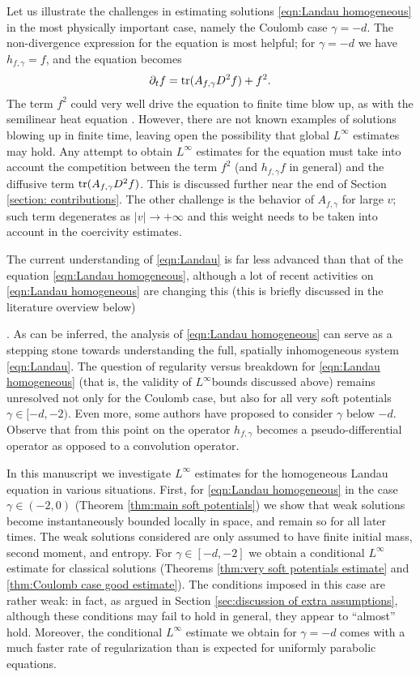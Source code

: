 \documentclass[12pt,american]{amsart}
\numberwithin{equation}{section}
\theoremstyle{plain}
\theoremstyle{definition}                  %
\def\tr{\textnormal{tr}}
\begin{document}
{Let us illustrate the challenges in estimating solutions \eqref{eqn:Landau homogeneous} in the most physically important case, namely the Coulomb case $\gamma = -d$. The non-divergence expression for the equation is most helpful; for $\gamma=-d$ we have $h_{f,\gamma} = f$, and the equation becomes
\begin{align*}
  \partial_t f = \tr(A_{f,\gamma}D^2f)+f^2.
\end{align*}
The term $f^2$ could very well drive the equation to finite time blow up, as with the semilinear heat equation \cite{GigaKohn85}. However, there are not known examples of solutions blowing up in finite time, leaving open the possibility that global $L^\infty$ estimates may hold. Any attempt to obtain $L^\infty$ estimates for the equation must take into account the competition between the term $f^2$ (and $h_{f,\gamma} f$ in general) and the diffusive term $\tr(A_{f,\gamma}D^2f)$. This is discussed further near the end of Section \ref{section: contributions}. The other challenge is the behavior of $A_{f,\gamma}$ for large $v$; such term degenerates as $|v|\to +\infty$ and this weight needs to be taken into account in the coercivity estimates.

The current understanding of \eqref{eqn:Landau} is far less advanced than that of the equation \eqref{eqn:Landau homogeneous}, although a lot of recent activities on \eqref{eqn:Landau homogeneous} are changing this (this is briefly discussed in the literature overview below)}. As can be inferred, the analysis of \eqref{eqn:Landau homogeneous} can serve as a stepping stone towards understanding the full, spatially inhomogeneous system \eqref{eqn:Landau}. The question of regularity versus breakdown for \eqref{eqn:Landau homogeneous} (that is, the validity of $L^\infty$bounds discussed above) remains unresolved not only for the Coulomb case, but also for all very soft potentials $\gamma \in [-d,-2)$. 
Even more, some authors have proposed to consider $\gamma$ below $-d$. Observe that from this point on the operator $h_{f,\gamma}$ becomes a pseudo-differential operator as opposed to a convolution operator. 

In this manuscript we investigate $L^\infty$ estimates for the homogeneous Landau equation in various situations. First, for \eqref{eqn:Landau homogeneous} in the case $\gamma\in(-2,0)$ (Theorem \ref{thm:main soft potentials}) we show that weak solutions become instantaneously bounded locally in space, and remain so for all later times. The weak solutions considered are only assumed to have finite initial mass, second moment, and entropy.  For $\gamma \in [-d,-2]$ we obtain a conditional $L^\infty$ estimate for classical solutions (Theorems \ref{thm:very soft potentials estimate} and \ref{thm:Coulomb case good estimate}). The conditions imposed in this case are rather weak: in fact, as argued in Section \ref{sec:discussion of extra assumptions}, although these conditions may fail to hold in general, they appear to ``almost'' hold. Moreover, the conditional $L^\infty$ estimate we obtain for $\gamma=-d$ comes with a much faster rate of regularization than is expected for uniformly parabolic equations.
\end{document}
